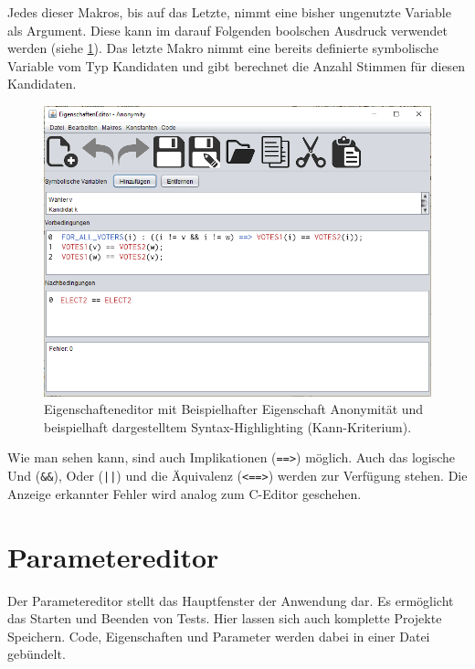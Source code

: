 \documentclass[a4paper]{scrreprt}
\begin{document}
Jedes dieser Makros, bis auf das Letzte, nimmt eine bisher ungenutzte Variable als Argument. Diese kann im darauf Folgenden boolschen Ausdruck verwendet werden (siehe \ref{Eigenschaften-Editor-Anonymität}). Das letzte Makro nimmt eine bereits definierte symbolische Variable vom Typ Kandidaten und gibt berechnet die Anzahl Stimmen für diesen Kandidaten.

\begin{figure}[H]
\includegraphics[scale=0.5]{Editor-vor-und-nachbedingungen-syntax-highlighting.png}
\caption{Eigenschafteneditor mit Beispielhafter Eigenschaft Anonymität und beispielhaft dargestelltem Syntax-Highlighting (Kann-Kriterium).}
\label{Eigenschaften-Editor-Anonymität}
\end{figure}

Wie man sehen kann, sind auch Implikationen (\verb!==>!) möglich. Auch das logische Und (\verb!&&!), Oder (\verb!||!) und die Äquivalenz (\verb!<==>!) werden zur Verfügung stehen. Die Anzeige erkannter Fehler wird analog zum C-Editor geschehen.

\section{Parametereditor}

Der Parametereditor stellt das Hauptfenster der Anwendung dar. Es ermöglicht das Starten und Beenden von Tests. Hier lassen sich auch komplette Projekte Speichern. Code, Eigenschaften und Parameter werden dabei in einer Datei gebündelt.
\end{document}
